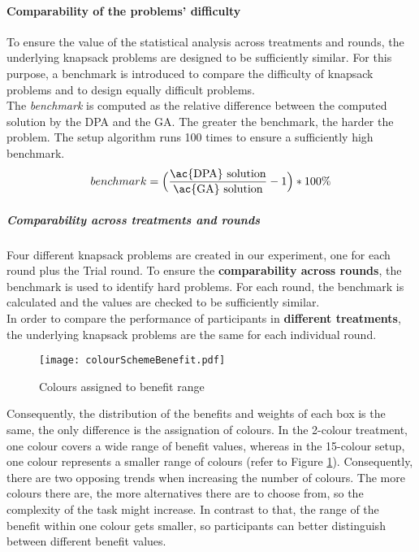 \paragraph{Comparability of the problems' difficulty}
To ensure the value of the statistical analysis across treatments and rounds, the underlying knapsack problems are designed to be sufficiently similar. For this purpose, a benchmark is introduced to compare the difficulty of knapsack problems and to design equally difficult problems.\\
The \textit{benchmark} is computed as the relative difference between the computed solution by the \ac{DPA} and the \ac{GA}. The greater the benchmark, the harder the problem.
The setup algorithm runs 100 times to ensure a sufficiently high benchmark.
\begin{equation}
benchmark = \Big(\dfrac{\text{\ac{DPA} solution}}{\text{\ac{GA} solution}} -1\Big) * 100\%
\end{equation}

\subparagraph{Comparability across treatments and rounds}
Four different knapsack problems are created in our experiment, one for each round plus the Trial round. To ensure the \textbf{comparability across rounds}, the benchmark is used to identify hard problems. For each round, the benchmark is calculated and the values are checked to be sufficiently similar.\\ 
In order to compare the performance of participants in \textbf{different treatments}, the underlying knapsack problems are the same for each individual round.
 \begin{figure}[htp] %
\begin{center}
  \texttt{[image: colourSchemeBenefit.pdf]}
\caption{Colours assigned to benefit range}
\label{fig:colourSchemeBenefit}
\end{center}
\end{figure}
Consequently, the distribution of the benefits and weights of each box is the same, the only difference is the assignation of colours. In the 2-colour treatment, one colour covers a wide range of benefit values, whereas in the 15-colour setup, one colour represents a smaller range of colours (refer to Figure \ref{fig:colourSchemeBenefit}).  Consequently, there are two opposing trends when increasing the number of colours. The more colours there are, the more alternatives there are to choose from, so the complexity of the task might increase. In contrast to that, the range of the benefit within one colour gets smaller, so participants can better distinguish between different benefit values.

